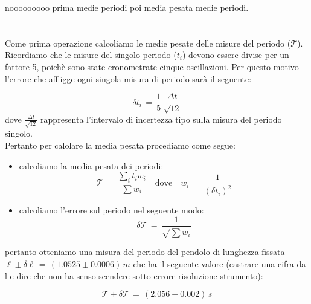 nooooooooo prima medie periodi poi media pesata medie periodi.\\\\\\
Come prima operazione calcoliamo le medie pesate delle misure del periodo ($\mathcal{T}$). Ricordiamo che le misure del singolo periodo ($t_i$) devono essere divise per un fattore 5, poichè sono state cronometrate cinque oscillazioni. Per questo motivo l'errore che affligge ogni singola misura di periodo sarà il seguente:

\begin{equation*}
	\delta t_i \,=\, \frac{1}{5} \, \frac{\Delta t}{\sqrt{12}}
\end{equation*}
%
dove $\frac{\Delta t}{\sqrt{12}}$ rappresenta l'intervalo di incertezza tipo sulla misura del periodo singolo.\\
Pertanto per calolare la media pesata procediamo come segue:
\begin{itemize}
	\item{calcoliamo la media pesata dei periodi:
			\begin{equation*}
				\mathcal{T} \,=\, \frac{\sum_i t_i w_i}{\sum w_i} \quad \text{dove} \quad w_i \,=\, \frac{1}{(\delta t_i)^2}
			\end{equation*}
			}
	\item{calcoliamo l'errore sul periodo nel seguente modo:
			\begin{equation*}
				\delta \mathcal{T} \,=\, \frac{1}{\sqrt{\sum w_i}}
			\end{equation*}
			}
\end{itemize}
pertanto otteniamo una misura del periodo del pendolo di lunghezza fissata $\ell \pm \delta \ell \,=\, (1.0525 \pm 0.0006) \, m$ che ha il seguente valore (castrare una cifra da l e dire che non ha senso scendere sotto errore risoluzione strumento):

\begin{equation*}
	\mathcal{T} \pm \delta \mathcal{T} \,=\, (2.056 \pm 0.002) \, s
\end{equation*}
%







